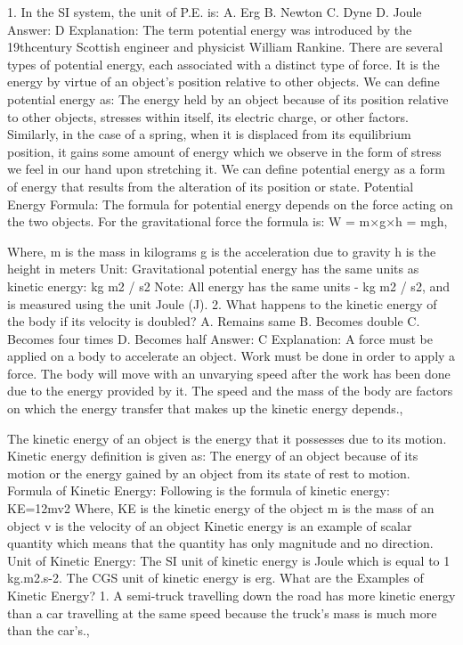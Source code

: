 1. In the SI system, the unit of P.E. is:
A. Erg
B. Newton
C. Dyne
D. Joule
Answer: D
Explanation: The term potential energy was introduced by the 19thcentury Scottish engineer and physicist William Rankine. There are
several types of potential energy, each associated with a distinct
type of force. It is the energy by virtue of an object’s position
relative to other objects.
We can define potential energy as: The energy held by an object
because of its position relative to other objects, stresses within
itself, its electric charge, or other factors.
Similarly, in the case of a spring, when it is displaced from its
equilibrium position, it gains some amount of energy which we
observe in the form of stress we feel in our hand upon stretching it.
We can define potential energy as a form of energy that results
from the alteration of its position or state.
Potential Energy Formula:
The formula for potential energy depends on the force acting on the
two objects. For the gravitational force the formula is:
W = m×g×h = mgh, 


Where,
m is the mass in kilograms
g is the acceleration due to gravity
h is the height in meters
Unit: Gravitational potential energy has the same units as kinetic
energy: kg m2 / s2
Note: All energy has the same units - kg m2 / s2, and is measured
using the unit Joule (J).
2. What happens to the kinetic energy of the body if its velocity
is doubled?
A. Remains same
B. Becomes double
C. Becomes four times
D. Becomes half
Answer: C
Explanation: A force must be applied on a body to accelerate an
object. Work must be done in order to apply a force. The body will
move with an unvarying speed after the work has been done due to
the energy provided by it. The speed and the mass of the body are
factors on which the energy transfer that makes up the kinetic
energy depends., 


The kinetic energy of an object is the energy that it possesses due
to its motion. Kinetic energy definition is given as: The energy of an
object because of its motion or the energy gained by an object from
its state of rest to motion.
Formula of Kinetic Energy:
Following is the formula of kinetic energy:
KE=12mv2
Where,
KE is the kinetic energy of the object
m is the mass of an object
v is the velocity of an object
Kinetic energy is an example of scalar quantity which means that the
quantity has only magnitude and no direction.
Unit of Kinetic Energy:
The SI unit of kinetic energy is Joule which is equal to 1 kg.m2.s-2.
The CGS unit of kinetic energy is erg.
What are the Examples of Kinetic Energy?
1. A semi-truck travelling down the road has more kinetic energy
than a car travelling at the same speed because the truck’s mass is
much more than the car’s., 


